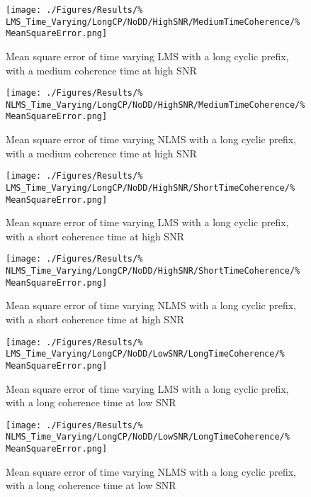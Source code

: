 \begin{figure}[ht]
	\begin{minipage}{0.49\textwidth}
		\texttt{[image: ./Figures/Results/\%
	LMS\_Time\_Varying/LongCP/NoDD/HighSNR/MediumTimeCoherence/\%
	MeanSquareError.png]}
		\captionsetup{width=0.75\linewidth}
		\caption{Mean square error of time varying LMS with a 
		long cyclic prefix, with a medium coherence time at 
		high SNR}
	\end{minipage}
	\begin{minipage}{0.49\textwidth}
		\texttt{[image: ./Figures/Results/\%
	NLMS\_Time\_Varying/LongCP/NoDD/HighSNR/MediumTimeCoherence/\%
	MeanSquareError.png]}
		\captionsetup{width=0.75\linewidth}
		\caption{Mean square error of time varying NLMS with 
		a long cyclic prefix, with a medium coherence time
		at high SNR}
	\end{minipage}
\end{figure}

\begin{figure}[ht]
	\centering
	\begin{minipage}{0.49\textwidth}
		\centering
		\texttt{[image: ./Figures/Results/\%
	LMS\_Time\_Varying/LongCP/NoDD/HighSNR/ShortTimeCoherence/\%
	MeanSquareError.png]}
		\captionsetup{width=0.75\linewidth}
		\caption{Mean square error of time varying LMS with a 
		long cyclic prefix, with a short coherence time at 
		high SNR}
		\label{fig:LMS-Short-High-None}
	\end{minipage}
	\begin{minipage}{0.49\textwidth}
		\centering
		\texttt{[image: ./Figures/Results/\%
	NLMS\_Time\_Varying/LongCP/NoDD/HighSNR/ShortTimeCoherence/\%
	MeanSquareError.png]}
		\captionsetup{width=0.75\linewidth}
		\caption{Mean square error of time varying NLMS with 
		a long cyclic prefix, with a short coherence time 
		at high SNR}
	\end{minipage}
\end{figure}

\begin{figure}[ht]
	\centering
	\begin{minipage}{0.49\textwidth}
		\centering
		\texttt{[image: ./Figures/Results/\%
	LMS\_Time\_Varying/LongCP/NoDD/LowSNR/LongTimeCoherence/\%
	MeanSquareError.png]}
		\captionsetup{width=0.75\linewidth}
		\caption{Mean square error of time varying LMS with a 
		long cyclic prefix, with a long coherence time at 
		low SNR}
	\end{minipage}
	\begin{minipage}{0.49\textwidth}
		\centering
		\texttt{[image: ./Figures/Results/\%
	NLMS\_Time\_Varying/LongCP/NoDD/LowSNR/LongTimeCoherence/\%
	MeanSquareError.png]}
		\captionsetup{width=0.75\linewidth}
		\caption{Mean square error of time varying NLMS with 
		a long cyclic prefix, with a long coherence time 
		at low SNR}
		\label{fig:NLMS-Long-Low-None-Long}
	\end{minipage}
\end{figure}

